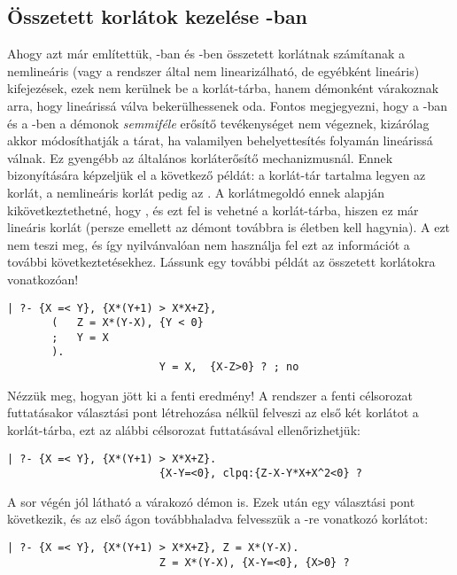 \subsection{Összetett korlátok kezelése \Clpq-ban}

Ahogy azt már említettük, \Clpq-ban és \Clpr-ben összetett korlátnak
számítanak a nemlineáris (vagy a rendszer által nem linearizálható, de
egyébként lineáris) kifejezések, ezek nem kerülnek be a korlát-tárba, hanem
démonként várakoznak arra, hogy lineárissá válva bekerülhessenek oda.
Fontos megjegyezni, hogy a \Clpq-ban és a \Clpr-ben a démonok
\emph{semmiféle} erősítő tevékenységet nem végeznek, kizárólag akkor
módosíthatják a tárat, ha valamilyen behelyettesítés folyamán lineárissá
válnak. Ez gyengébb az általános korláterősítő mechanizmusnál. Ennek
bizonyítására képzeljük el a következő példát: a korlát-tár tartalma legyen
az  korlát, a nemlineáris korlát pedig az . A
korlátmegoldó ennek alapján kikövetkeztethetné, hogy , és ezt
fel is vehetné a korlát-tárba, hiszen ez már lineáris korlát (persze emellett
az  démont továbbra is életben kell hagynia). A  ezt
nem teszi meg, és így nyilvánvalóan nem használja fel ezt az információt
a további következtetésekhez.
\br
Lássunk egy további példát az összetett korlátokra vonatkozóan!

\begin{verbatim}
| ?- {X =< Y}, {X*(Y+1) > X*X+Z}, 
       (   Z = X*(Y-X), {Y < 0}
       ;   Y = X
       ).
                        Y = X,  {X-Z>0} ? ; no
\end{verbatim}

Nézzük meg, hogyan jött ki a fenti eredmény! A rendszer a fenti célsorozat
futtatásakor választási pont létrehozása nélkül felveszi az első két korlátot
a korlát-tárba, ezt az alábbi célsorozat futtatásával ellenőrizhetjük:

\begin{verbatim}
| ?- {X =< Y}, {X*(Y+1) > X*X+Z}.
                        {X-Y=<0}, clpq:{Z-X-Y*X+X^2<0} ?
\end{verbatim}

A sor végén jól látható a várakozó démon is. Ezek után egy választási pont
következik, és az első ágon továbbhaladva felvesszük a -re vonatkozó
korlátot:

\begin{verbatim}
| ?- {X =< Y}, {X*(Y+1) > X*X+Z}, Z = X*(Y-X).
                        Z = X*(Y-X), {X-Y=<0}, {X>0} ? 
\end{verbatim}

